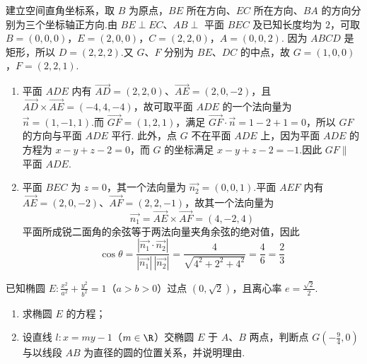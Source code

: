 \begin{solution}
建立空间直角坐标系，取 \(B\) 为原点，\(BE\) 所在方向、\(EC\) 所在方向、\(BA\) 的方向分别为三个坐标轴正方向.由 \(BE\perp EC\)、\(AB\perp\) 平面 \(BEC\) 及已知长度均为 \(2\)，可取
\(B=(0,0,0)\)，\(E=(2,0,0)\)，\(C=(2,2,0)\)，\(A=(0,0,2)\).
因为 \(ABCD\) 是矩形，所以 \(D=(2,2,2)\).又 \(G\)、\(F\) 分别为 \(BE\)、\(DC\) 的中点，故
\(G=(1,0,0)\)，\(F=(2,2,1)\).

\begin{enumerate}
\item 平面 \(ADE\) 内有
\(\overrightarrow{AD}=(2,2,0)\)、\(\overrightarrow{AE}=(2,0,-2)\)，且
\(\overrightarrow{AD}\times\overrightarrow{AE}=(-4,4,-4)\)，故可取平面 \(ADE\) 的一个法向量为 \(\overrightarrow{n}=(1,-1,1)\).而
\(\overrightarrow{GF}=(1,2,1)\)，满足
\(\overrightarrow{GF}\cdot\overrightarrow{n}=1-2+1=0\)，所以 \(GF\) 的方向与平面 \(ADE\) 平行.
此外，点 \(G\) 不在平面 \(ADE\) 上，因为平面 \(ADE\) 的方程为 \(x-y+z-2=0\)，而 \(G\) 的坐标满足 \(x-y+z-2=-1\).因此 \(GF\parallel\) 平面 \(ADE\).

\item 平面 \(BEC\) 为 \(z=0\)，其一个法向量为 \(\overrightarrow{n_2}=(0,0,1)\).平面 \(AEF\) 内有
\(\overrightarrow{AE}=(2,0,-2)\)、\(\overrightarrow{AF}=(2,2,-1)\)，故其一个法向量为
\[
\overrightarrow{n_1}=\overrightarrow{AE}\times\overrightarrow{AF}=(4,-2,4)
\]
平面所成锐二面角的余弦等于两法向量夹角余弦的绝对值，因此
\[
\cos\theta=\frac{|\overrightarrow{n_1}\cdot\overrightarrow{n_2}|}{|\overrightarrow{n_1}|\,|\overrightarrow{n_2}|}
=\frac{4}{\sqrt{4^2+2^2+4^2}}=\frac{4}{6}=\frac23
\]
\end{enumerate}
\end{solution}

\begin{problem}
已知椭圆 \(E: \frac{x^2}{a^2} + \frac{y^2}{b^2} = 1\)（\(a > b > 0\)）过点 \((0, \sqrt{2})\)，且离心率 \(e = \frac{\sqrt{2}}{2}\).
\begin{enumerate}
\item 求椭圆 \(E\) 的方程；
\item 设直线 \(l: x = my - 1\)（\(m \in \R\)）交椭圆 \(E\) 于 \(A\)、\(B\) 两点，判断点 \(G\left(-\frac{9}{4}, 0\right)\) 与以线段 \(AB\) 为直径的圆的位置关系，并说明理由.
\end{enumerate}
\end{problem}

